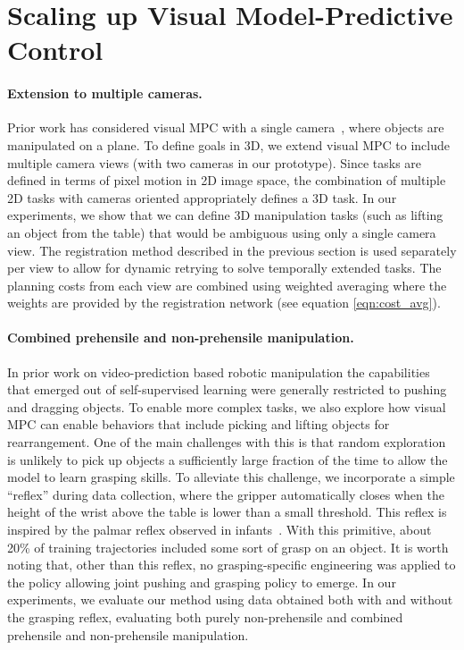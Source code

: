 \section{Scaling up Visual Model-Predictive Control}
\label{sec:scalingup}
\paragraph{Extension to multiple cameras.}
Prior work has considered visual MPC with a single camera~\cite{foresight,sna}, where objects are manipulated on a plane. To define goals in 3D, we extend visual MPC to include multiple camera views (with two cameras in our prototype). Since tasks are defined in terms of pixel motion in 2D image space, the combination of multiple 2D tasks with cameras oriented appropriately defines a 3D task. In our experiments, we show that we can define 3D manipulation tasks (such as lifting an object from the table) that would be ambiguous using only a single camera view. The registration method described in the previous section is used separately per view to allow for dynamic retrying to solve temporally extended tasks. The planning costs from each view are combined using weighted averaging where the weights are provided by the registration network (see equation \ref{eqn:cost_avg}). 

\vspace{-0.1in}
\paragraph{Combined prehensile and non-prehensile manipulation.}
In prior work on video-prediction based robotic manipulation \cite{sna, foresight} the capabilities that emerged out of self-supervised learning were generally restricted to pushing and dragging objects. To enable more complex tasks, we also explore how visual MPC can enable behaviors that include picking and lifting objects for rearrangement. One of the main challenges with this is that random exploration is unlikely to pick up objects a sufficiently large fraction of the time to allow the model to learn grasping skills. To alleviate this challenge, we incorporate a simple ``reflex'' during data collection, where the gripper automatically closes when the height of the wrist above the table is lower than a small threshold. This reflex is inspired by the palmar reflex observed in infants~\cite{grasping_fetal}. With this primitive, about 20\% of training trajectories included some sort of grasp on an object. It is worth noting that, other than this reflex, no grasping-specific engineering was applied to the policy allowing joint pushing and grasping policy to emerge. In our experiments, we evaluate our method using data obtained both with and without the grasping reflex, evaluating both purely non-prehensile and combined prehensile and non-prehensile manipulation.

